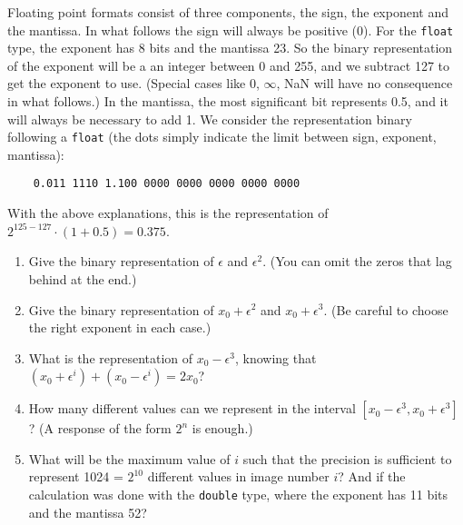 \documentclass[11pt]{article}
\begin{document}
Floating point formats consist of three components, the sign, the exponent and the
mantissa. In what follows the sign will always be positive (0). For the \texttt{float} type, the exponent
has 8 bits and the mantissa 23. So the binary representation of the exponent will be a
an integer between 0 and 255, and we subtract 127 to get the exponent to use. (Special cases
like 0, $\infty$, NaN will have no consequence in what follows.) In the mantissa, the most significant bit 
represents 0.5, and it will always be necessary to add 1. We consider the representation
binary following a \texttt{float} (the dots simply indicate the limit between sign, exponent,
mantissa):
\begin{verbatim}
	0.011 1110 1.100 0000 0000 0000 0000 0000
\end{verbatim}
With the above explanations, this is the representation of $2^{125-127}\cdot (1 + 0.5) = 0.375$.

\begin{enumerate}
	\item Give the binary representation of $\epsilon$ and $\epsilon^2$. (You can omit the zeros that lag behind at the end.)
	\item Give the binary representation of $x_0+\epsilon^2$ and $x_0 + \epsilon^3$. (Be careful to choose the right exponent in each case.)
	\item What is the representation of $x_0 - \epsilon^3$, knowing that $(x_0+\epsilon^i)+(x_0-\epsilon^i) = 2x_0$?
	\item How many different values can we represent in the interval $ [x_0 - \epsilon^3, x_0 + \epsilon^3]$?
	(A response of the form $2^n$ is enough.)
	\item What will be the maximum value of $i$ such that the precision is sufficient to represent 1024 = $2^10$
	different values in image number $i$? And if the calculation was done with the  \texttt{double} type,
	where the exponent has 11 bits and the mantissa 52?
\end{enumerate}
\end{document}
